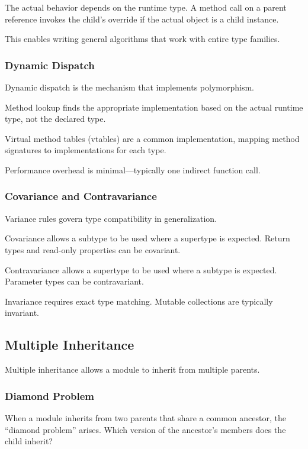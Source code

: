 \documentclass[11pt]{article}
\begin{document}
The actual behavior depends on the runtime type. A method call on a parent reference invokes the child's override if the actual object is a child instance.

This enables writing general algorithms that work with entire type families.

\subsubsection{Dynamic Dispatch}

Dynamic dispatch is the mechanism that implements polymorphism.

Method lookup finds the appropriate implementation based on the actual runtime type, not the declared type.

Virtual method tables (vtables) are a common implementation, mapping method signatures to implementations for each type.

Performance overhead is minimal---typically one indirect function call.

\subsubsection{Covariance and Contravariance}

Variance rules govern type compatibility in generalization.

Covariance allows a subtype to be used where a supertype is expected. Return types and read-only properties can be covariant.

Contravariance allows a supertype to be used where a subtype is expected. Parameter types can be contravariant.

Invariance requires exact type matching. Mutable collections are typically invariant.

\subsection{Multiple Inheritance}

Multiple inheritance allows a module to inherit from multiple parents.

\subsubsection{Diamond Problem}

When a module inherits from two parents that share a common ancestor, the ``diamond problem'' arises. Which version of the ancestor's members does the child inherit?
\end{document}
